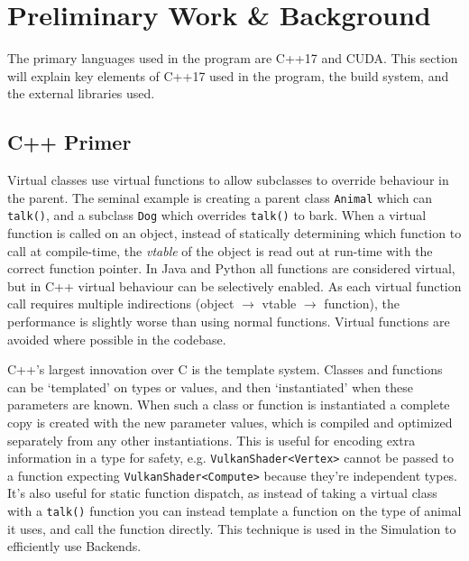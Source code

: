 \section{Preliminary Work \& Background}
The primary languages used in the program are C++17 and CUDA.
This section will explain key elements of C++17 used in the program, the build system, and the external libraries used.

\subsection{C++ Primer}
Virtual classes use virtual functions to allow subclasses to override behaviour in the parent.
The seminal example is creating a parent class \texttt{Animal} which can \texttt{talk()}, and a subclass \texttt{Dog} which overrides \texttt{talk()} to bark. 
When a virtual function is called on an object, instead of statically determining which function to call at compile-time, the \emph{vtable} of the object is read out at run-time with the correct function pointer.
In Java and Python all functions are considered virtual, but in C++ virtual behaviour can be selectively enabled.
As each virtual function call requires multiple indirections (object $\rightarrow$ vtable $\rightarrow$ function), the performance is slightly worse than using normal functions.
Virtual functions are avoided where possible in the codebase.

C++'s largest innovation over C is the template system.
Classes and functions can be `templated' on types or values, and then `instantiated' when these parameters are known.
When such a class or function is instantiated a complete copy is created with the new parameter values, which is compiled and optimized separately from any other instantiations.
This is useful for encoding extra information in a type for safety, e.g. \texttt{VulkanShader<Vertex>} cannot be passed to a function expecting \texttt{VulkanShader<Compute>} because they're independent types.
It's also useful for static function dispatch, as instead of taking a virtual class with a \texttt{talk()} function you can instead template a function on the type of animal it uses, and call the function directly.
This technique is used in the Simulation to efficiently use Backends.

